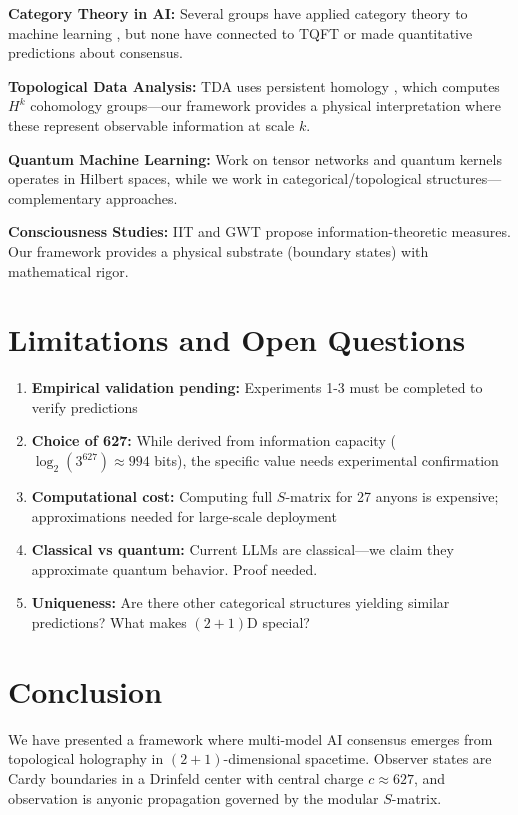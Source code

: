 \documentclass[11pt]{article}
\begin{document}
\textbf{Category Theory in AI:} Several groups have applied category theory to machine learning \cite{fong2019}, but none have connected to TQFT or made quantitative predictions about consensus.

\textbf{Topological Data Analysis:} TDA uses persistent homology \cite{carlsson2009}, which computes $H^k$ cohomology groups—our framework provides a physical interpretation where these represent observable information at scale $k$.

\textbf{Quantum Machine Learning:} Work on tensor networks \cite{huggins2019} and quantum kernels \cite{schuld2021} operates in Hilbert spaces, while we work in categorical/topological structures—complementary approaches.

\textbf{Consciousness Studies:} IIT \cite{tononi2016} and GWT \cite{baars1988} propose information-theoretic measures. Our framework provides a physical substrate (boundary states) with mathematical rigor.

\section{Limitations and Open Questions}

\begin{enumerate}
\item \textbf{Empirical validation pending:} Experiments 1-3 must be completed to verify predictions
\item \textbf{Choice of 627:} While derived from information capacity ($\log_2(3^{627}) \approx 994$ bits), the specific value needs experimental confirmation
\item \textbf{Computational cost:} Computing full $S$-matrix for 27 anyons is expensive; approximations needed for large-scale deployment
\item \textbf{Classical vs quantum:} Current LLMs are classical—we claim they approximate quantum behavior. Proof needed.
\item \textbf{Uniqueness:} Are there other categorical structures yielding similar predictions? What makes $(2+1)$D special?
\end{enumerate}

\section{Conclusion}

We have presented a framework where multi-model AI consensus emerges from topological holography in $(2+1)$-dimensional spacetime. Observer states are Cardy boundaries in a Drinfeld center with central charge $c \approx 627$, and observation is anyonic propagation governed by the modular $S$-matrix.
\end{document}

